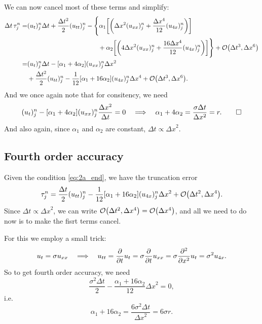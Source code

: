 \documentclass[11pt,letter, swedish, english
]{article}
\newcommand{\Dx}{\ensuremath{\Delta{x}}}
\newcommand{\Dt}{\ensuremath{\Delta{t}}}
\begin{document}
We can now cancel most of these terms and simplify:
\begin{equation}
\begin{aligned}
\Dt\,\tau_j^n=& (u_t)_j^n\Dt+\frac{\Dt^2}{2}(u_{tt})_j^n
-\Bigg\{\alpha_1\qty[
\qty(\Dx^2(u_{xx})_j^n+\frac{\Dx^4}{12}(u_{4x})_j^n)]
\\ &\hspace{110pt}
+\alpha_2\qty[
\qty(4\Dx^2(u_{xx})_j^n+\frac{16\Dx^4}{12}(u_{4x})_j^n)]
\Bigg\} +\order{\Dt^3, \Dx^6}\\
=& (u_t)_j^n\Dt -[\alpha_1+4\alpha_2](u_{xx})_j^n\Dx^2\\
&+\frac{\Dt^2}{2}(u_{tt})_j^n-\frac{1}{12}[\alpha_1+16\alpha_2](u_{4x})_j^n\Dx^4
+\order{\Dt^3, \Dx^6}.
\end{aligned}
\end{equation}
And we once again note that for consitency, we need 
\begin{equation}\label{eq:2a_end}
(u_t)_j^n-[\alpha_1+4\alpha_2](u_{xx})_j^n\frac{\Dx^2}{\Dt}=0
\quad\Longrightarrow\quad
\alpha_1+4\alpha_2=\frac{\sigma\Dt}{\Dx^2}=r.
\qed
\end{equation}
And also again, since $\alpha_1$ and $\alpha_2$ are constant,
$\Dt\propto\Dx^2$. 

\subsection{Fourth order accuracy}

Given the condition \eqref{eq:2a_end}, we have the truncation error
\begin{equation}
\tau_j^n=\frac{\Dt}{2}(u_{tt})_j^n
-\frac{1}{12}[\alpha_1+16\alpha_2](u_{4x})_j^n\Dx^2
+\order{\Dt^2, \Dx^4}.
\end{equation}
Since $\Dt\propto\Dx^2$, we can write $\order{\Dt^2,
  \Dx^4}=\order{\Dx^4}$, and all we need to do now is to make the
fisrt terms cancel.

For this we employ a small trick:
\begin{equation}
u_t=\sigma u_{xx}
\quad\Longrightarrow\quad
u_{tt}=\pdv{t}u_t=\sigma\pdv{t}u_{xx}
=\sigma\pdv[2]{x}u_t=\sigma^2u_{4x}.
\end{equation}
So to get fourth order accuracy, we need
\begin{equation}
\frac{\sigma^2\Dt}{2}-\frac{\alpha_1+16\alpha_2}{12}\Dx^2=0,
\end{equation}
i.e.
\begin{equation}
\alpha_1+16\alpha_2=\frac{6\sigma^2\Dt}{\Dx^2}=6\sigma r.
\end{equation}
\end{document}
